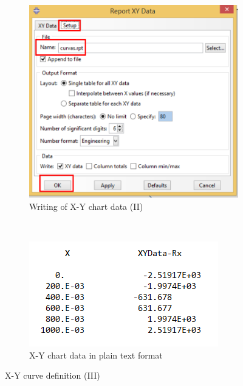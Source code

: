 \begin{enumerate}
\begin{figure}[H]
  \begin{subfigure}{0.50\textwidth}
    \includegraphics[width=\textwidth]{./body/images/imagen112.pdf}
    \caption{Writing of X-Y chart data (II)}
    \label{figu112}
  \end{subfigure}%
  ~ %
  \begin{subfigure}{0.50\textwidth}
    \includegraphics[width=\textwidth]{./body/images/imagen113}
    \caption{X-Y chart data in plain text format}
    \label{figu113}
  \end{subfigure}%
  \caption{X-Y curve definition (III)}
\end{figure}

\end{enumerate}


